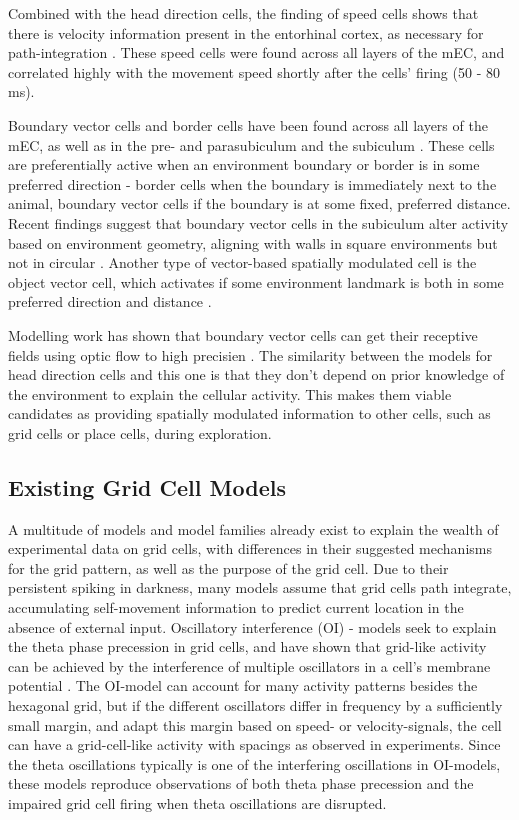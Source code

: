 \documentclass{article}
\begin{document}
    Combined with the head direction cells, the finding of speed cells shows that there is velocity information present in the entorhinal cortex, as necessary for path-integration \parencite{Kropff2015}. These speed cells were found across all layers of the mEC, and correlated highly with the movement speed shortly after the cells' firing (50 - 80 ms).

    Boundary vector cells and border cells have been found across all layers of the mEC, as well as in the pre- and parasubiculum and the subiculum \parencite{Solstad2008,Boccara2010, Lever2009}. These cells are preferentially active when an environment boundary or border is in some preferred direction - border cells when the boundary is immediately next to the animal, boundary vector cells if the boundary is at some fixed, preferred distance. Recent findings suggest that boundary vector cells in the subiculum alter activity based on environment geometry, aligning with walls in square environments but not in circular \parencite{Muessig2024}. Another type of vector-based spatially modulated cell is the object vector cell, which activates if some environment landmark is both in some preferred direction and distance \parencite{Høydal2019}.

    Modelling work has shown that boundary vector cells can get their receptive fields using optic flow to high precisien \parencite{Raudies2012}. The similarity between the models for head direction cells and this one is that they don't depend on prior knowledge of the environment to explain the cellular activity. This makes them viable candidates as providing spatially modulated information to other cells, such as grid cells or place cells, during exploration.


    \subsection{Existing Grid Cell Models} \label{Grid Models}
    A multitude of models and model families already exist to explain the wealth of experimental data on grid cells, with differences in their suggested mechanisms for the grid pattern, as well as the purpose of the grid cell. Due to their persistent spiking in darkness, many models assume that grid cells path integrate, accumulating self-movement information to predict current location in the absence of external input. Oscillatory interference (OI) - models seek to explain the theta phase precession in grid cells, and have shown that grid-like activity can be achieved by the interference of multiple oscillators in a cell's membrane potential \parencite{Burgess2007,Zilli2010}. The OI-model can account for many activity patterns besides the hexagonal grid, but if the different oscillators differ in frequency by a sufficiently small margin, and adapt this margin based on speed- or velocity-signals, the cell can have a grid-cell-like activity with spacings as observed in experiments. Since the theta oscillations typically is one of the interfering oscillations in OI-models, these models reproduce observations of both theta phase precession and the impaired grid cell firing when theta oscillations are disrupted.
\end{document}
